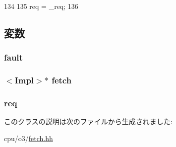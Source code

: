 \begin{DoxyCode}
134         {
135             req = _req;
136         }
\end{DoxyCode}


\subsection{変数}
\hypertarget{classDefaultFetch_1_1FinishTranslationEvent_a68714ceb74c60ea7ef5dec335bb6c5d7}{
\subsubsection[{fault}]{ {\bf fault}}}
\label{classDefaultFetch_1_1FinishTranslationEvent_a68714ceb74c60ea7ef5dec335bb6c5d7}
\hypertarget{classDefaultFetch_1_1FinishTranslationEvent_a10f1a41fdcff6e7574a83b020d3c1a91}{
\subsubsection[{fetch}]{$<$Impl$>$$\ast$ {\bf fetch}}}
\label{classDefaultFetch_1_1FinishTranslationEvent_a10f1a41fdcff6e7574a83b020d3c1a91}
\hypertarget{classDefaultFetch_1_1FinishTranslationEvent_a956cd41d82347558b9c0a5b0474903f2}{
\subsubsection[{req}]{ {\bf req}}}
\label{classDefaultFetch_1_1FinishTranslationEvent_a956cd41d82347558b9c0a5b0474903f2}


このクラスの説明は次のファイルから生成されました:\begin{DoxyCompactItemize}
\item 
cpu/o3/\hyperlink{fetch_8hh}{fetch.hh}\end{DoxyCompactItemize}

